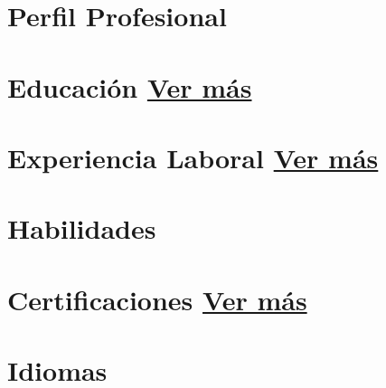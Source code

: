 \documentclass[letterpaper,12pt]{fed-res}
\begin{document}


\section{Perfil Profesional}


\section{Educación \hfill \href{\urlEducationEs}{Ver más}}


\section{Experiencia Laboral \hfill \href{\urlWorkEs}{Ver más}}


\section{Habilidades}


\section{Certificaciones \hfill \href{\urlCertsEs}{Ver más}}


\section{Idiomas}

\end{document}
